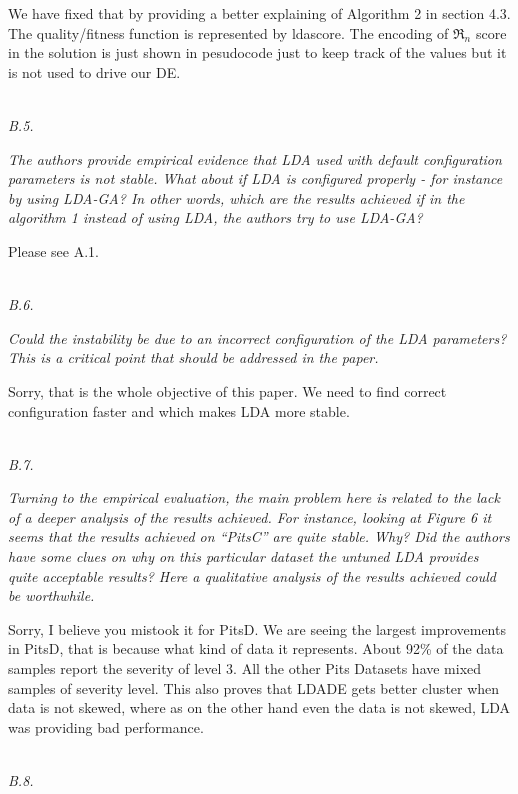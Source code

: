 \documentclass[conference]{IEEEtran}
\begin{document}
We have fixed that by providing a better explaining of Algorithm 2 in section 4.3. The quality/fitness function is represented by ldascore. The encoding of $\Re_n$ score in the solution is just shown in pesudocode just to keep track of the values but it is not used to drive our DE. 

\noindent
\textit{\\B.5.}  

\textit{The authors provide empirical evidence that LDA used with default configuration parameters is not stable. What about if LDA is configured properly - for instance by using LDA-GA? In other words, which are the results achieved if in the algorithm 1 instead of using LDA, the authors try to use LDA-GA?\\}

Please see A.1.

\noindent
\textit{\\B.6.}  

\textit{Could the instability be due to an incorrect configuration of the LDA parameters? This is a critical point that should be addressed in the paper.\\}

Sorry, that is the whole objective of this paper. We need to find correct configuration faster and which makes LDA more stable.

\noindent
\textit{\\B.7.}   

\textit{Turning to the empirical evaluation, the main problem here is related to the lack of a deeper analysis of the results achieved. For instance, looking at Figure 6 it seems that the results achieved on “PitsC” are quite stable. Why? Did the authors have some clues on why on this particular dataset the untuned LDA provides quite acceptable results? Here a qualitative analysis of the results achieved could be worthwhile.\\}

Sorry, I believe you mistook it for PitsD. We are seeing the largest improvements in PitsD, that is because what kind of data it represents. About 92\% of the data samples report the severity of level 3.  All the other Pits Datasets have mixed samples of severity level. This also proves that LDADE gets better cluster when data is not skewed, where as on the other hand even the data is not skewed, LDA was providing bad performance.

\noindent
\textit{\\B.8.} 
\end{document}
